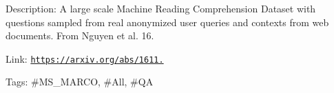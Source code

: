 Description\+: A large scale Machine Reading Comprehension Dataset with questions sampled from real anonymized user queries and contexts from web documents. From Nguyen et al. \textquotesingle{}16.

Link\+: \href{https://arxiv.org/abs/1611.09268}{\tt https\+://arxiv.\+org/abs/1611.}

Tags\+: \#\+M\+S\+\_\+\+M\+A\+R\+CO, \#\+All, \#\+QA 
